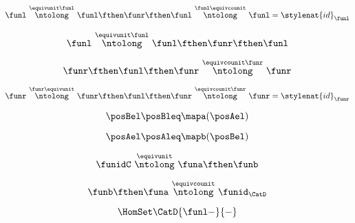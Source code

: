 \begin{forslides}
    \begin{equation}
        \label{eq:slides_adjunctions_53b}
        \funl \ \overset{\equivunit \funl }{\ntolong}\ \funl \fthen \funr  \fthen \funl \ \overset{\funl \equivcounit}{\ntolong}\ \funl = \stylenat{id}_\funl
    \end{equation}
    
     \begin{equation}
        \label{eq:slides_adjunctions_54}
       \funl \ \overset{\equivunit \funl }{\ntolong}\ \funl \fthen \funr \fthen \funl 
    \end{equation}
    
     \begin{equation}
        \label{eq:slides_adjunctions_55}
       \funr \fthen \funl \fthen \funr  \ \overset{\equivcounit \funr}{\ntolong}\ \funr 
    \end{equation}
    
    \begin{equation}
        \label{eq:slides_adjunctions_55b}
       \funr \ \overset{\funr\equivunit}{\ntolong}\ \funr \fthen \funl \fthen \funr  \ \overset{\equivcounit \funr}{\ntolong}\ \funr  =  \stylenat{id}_\funr
    \end{equation}
    
     \begin{equation}
        \label{eq:slides_adjunctions_56}
       \posBel \posBleq \mapa(\posAel)
    \end{equation}
    
     \begin{equation}
        \label{eq:slides_adjunctions_57}
       \posAel \posAleq \mapb(\posBel)
    \end{equation}
    
     \begin{equation}
        \label{eq:slides_adjunctions_58}
       \funidC \ \overset{\equivunit}{\ntolong}\ \funa \fthen \funb
    \end{equation}
    
     \begin{equation}
        \label{eq:slides_adjunctions_59}
       \funb \fthen \funa \ \overset{\equivcounit}{\ntolong}\ \funid_\CatD
    \end{equation}
    
    \begin{equation}
        \label{eq:slides_adjunctions_60}
       \HomSet\CatD{\funl -}{-} 
    \end{equation}
    

\end{forslides}
